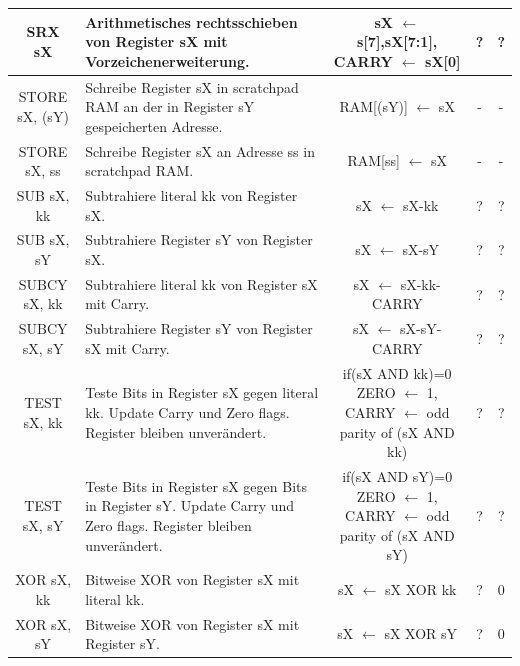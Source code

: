 \documentclass{scrartcl}
\begin{document}
\begin{longtable}{||c|p{4cm}|c|c|c||}
         SRX sX & Arithmetisches rechtsschieben von Register sX mit Vorzeichenerweiterung. &sX $\leftarrow$ {s[7],sX[7:1]}, CARRY $\leftarrow$ sX[0] & ? & ?  \\ \hline
         STORE sX, (sY) & Schreibe Register sX in scratchpad RAM an der in Register sY gespeicherten Adresse. &RAM[(sY)] $\leftarrow$ sX & - & -  \\ \hline
         STORE sX, ss & Schreibe Register sX an Adresse ss in scratchpad RAM. &RAM[ss] $\leftarrow$ sX  & - & -  \\ \hline
         SUB sX, kk & Subtrahiere literal kk von Register sX. &sX $\leftarrow$ sX-kk & ? & ?  \\ \hline
         SUB sX, sY & Subtrahiere Register sY von Register sX. &sX $\leftarrow$ sX-sY & ? & ?  \\ \hline
         SUBCY sX, kk & Subtrahiere literal kk von Register sX mit Carry. &sX $\leftarrow$ sX-kk-CARRY  & ? & ?  \\ \hline
         SUBCY sX, sY & Subtrahiere Register sY von Register sX mit Carry. &sX $\leftarrow$ sX-sY-CARRY & ? & ?  \\ \hline
         TEST sX, kk & Teste Bits in Register sX gegen literal kk. Update Carry und Zero flags. Register bleiben unverändert. & \makecell{if(sX AND kk)=0 ZERO $\leftarrow$ 1, \\ CARRY $\leftarrow$ odd parity of (sX AND kk) } & ? & ?  \\ \hline
         TEST sX, sY  & Teste Bits in Register sX gegen Bits in Register sY. Update Carry und Zero flags. Register bleiben unverändert. & \makecell{if(sX AND sY)=0 ZERO $\leftarrow$ 1, \\ CARRY $\leftarrow$ odd parity of (sX AND sY) } & ? & ?  \\ \hline
         XOR sX, kk & Bitweise XOR von Register sX mit literal kk. &sX $\leftarrow$ sX XOR kk & ? & 0  \\ \hline
         XOR sX, sY & Bitweise XOR von Register sX mit Register sY. &sX $\leftarrow$ sX XOR sY  & ? & 0  \\ \hline
         
    \end{longtable}
\end{document}
